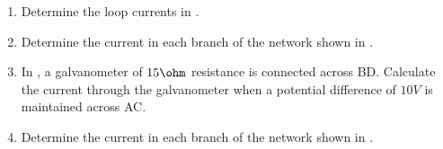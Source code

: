 \begin{enumerate}[label=\thesubsection.\arabic*.,ref=\thesubsection.\theenumi]
	\item Determine the loop currents in 
    . 
		\begin{figure}[H] 
    \centering
    \resizebox{0.75\columnwidth}{!}{
    }
    \caption{} 
    \label{fig:ckt1} 
\end{figure}
	\item Determine the current in each branch of the network shown in 
    . 
		\begin{figure}[H] 
    \centering
    \resizebox{0.75\columnwidth}{!}{
    }
    \caption{} 
    \label{fig:ckt2} 
\end{figure}
	\item In , a galvanometer of $15\ohm$ resistance is connected across BD. Calculate the current through the galvanometer when a potential difference of $10 V$ is maintained across AC.
		\begin{figure}[H] 
    \centering
    \resizebox{0.5\columnwidth}{!}{
    }
    \caption{} 
    \label{fig:ckt3} 
\end{figure}
	\item Determine the current in each branch of the network shown in 
.
		\begin{figure}[H] 
    \centering
    \resizebox{0.4\columnwidth}{!}{
    }
    \caption{} 
    \label{fig:ckt4} 
\end{figure}
\end{enumerate}
 

